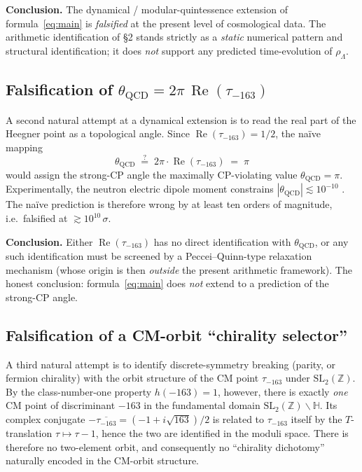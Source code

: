 \documentclass[11pt,a4paper]{article}
\newcommand{\Z}{\mathbb{Z}}
\newcommand{\HH}{\mathbb{H}}
\newcommand{\SL}{\mathrm{SL}}
\renewcommand{\Re}{\operatorname{Re}}
\newcommand{\rhoL}{\rho_{\Lambda}}
\newcommand{\thQCD}{\theta_{\mathrm{QCD}}}
\theoremstyle{plain}
\begin{document}
\smallskip
\noindent\textbf{Conclusion.} The dynamical / modular-quintessence extension of formula~\eqref{eq:main} is \emph{falsified} at the present level of cosmological data. The arithmetic identification of \S2 stands strictly as a \emph{static} numerical pattern and structural identification; it does \emph{not} support any predicted time-evolution of $\rhoL$.

\subsection{Falsification of $\thQCD = 2\pi\,\Re(\tau_{-163})$}\label{sec:5ter}

A second natural attempt at a dynamical extension is to read the real part of the Heegner point as a topological angle. Since $\Re(\tau_{-163})=1/2$, the naïve mapping
\[
  \thQCD \;\stackrel{?}{=}\; 2\pi\cdot\Re(\tau_{-163}) \;=\; \pi
\]
would assign the strong-CP angle the maximally CP-violating value $\thQCD=\pi$. Experimentally, the neutron electric dipole moment constrains $|\thQCD|\lesssim 10^{-10}$ \cite{nEDM2020}. The naïve prediction is therefore wrong by at least ten orders of magnitude, i.e.\ falsified at $\gtrsim 10^{10}\,\sigma$.

\smallskip
\noindent\textbf{Conclusion.} Either $\Re(\tau_{-163})$ has no direct identification with $\thQCD$, or any such identification must be screened by a Peccei--Quinn-type relaxation mechanism \cite{PecceiQuinn1977} (whose origin is then \emph{outside} the present arithmetic framework). The honest conclusion: formula~\eqref{eq:main} does \emph{not} extend to a prediction of the strong-CP angle.

\subsection{Falsification of a CM-orbit ``chirality selector''}\label{sec:5quater}

A third natural attempt is to identify discrete-symmetry breaking (parity, or fermion chirality) with the orbit structure of the CM point $\tau_{-163}$ under $\SL_{2}(\Z)$. By the class-number-one property $h(-163)=1$, however, there is exactly \emph{one} CM point of discriminant $-163$ in the fundamental domain $\SL_{2}(\Z)\backslash\HH$. Its complex conjugate $-\overline{\tau_{-163}}=(-1+i\sqrt{163})/2$ is related to $\tau_{-163}$ itself by the $T$-translation $\tau\mapsto\tau-1$, hence the two are identified in the moduli space. There is therefore no two-element orbit, and consequently no ``chirality dichotomy'' naturally encoded in the CM-orbit structure.
\end{document}

